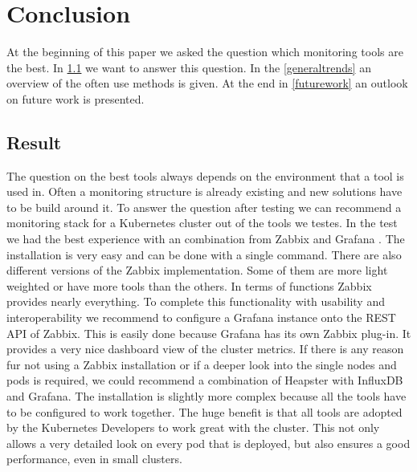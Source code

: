 
\chapter{Conclusion}\label{chap:conclusion}
At the beginning of this paper we asked the question which monitoring tools are the best.
In \cref{result} we want to answer this question. In the \cref{generaltrends} an overview of the often use methods is given. At the end in \cref{futurework} an outlook on future work is presented. 
\section{Result}
\label{result}
The question on the best tools always depends on the environment that a tool is used in. Often a monitoring structure is already existing and new solutions have to be build around it.
To answer the question after testing we can recommend a monitoring stack for a Kubernetes cluster out of the tools we testes. In the test we had the best experience with an combination from Zabbix and Grafana . The installation is very easy and can be done with a single command. There are also different versions of the Zabbix implementation. Some of them are more light weighted or have more tools than the others. In terms of functions Zabbix provides nearly everything. To complete this functionality with usability and interoperability we recommend to configure a Grafana instance onto the REST API of Zabbix. This is easily done because Grafana has its own Zabbix plug-in. It provides a very nice dashboard view of the cluster metrics.
If there is any reason fur not using a Zabbix installation or if a deeper look into the single nodes and pods is required, we could recommend a combination of Heapster with InfluxDB and Grafana. The installation is slightly more complex because all the tools have to be configured to work together. The huge benefit is that all tools are adopted by the Kubernetes Developers to work great with the cluster. This not only allows a very detailed look on every pod that is deployed, but also ensures a good performance, even in small clusters. 

